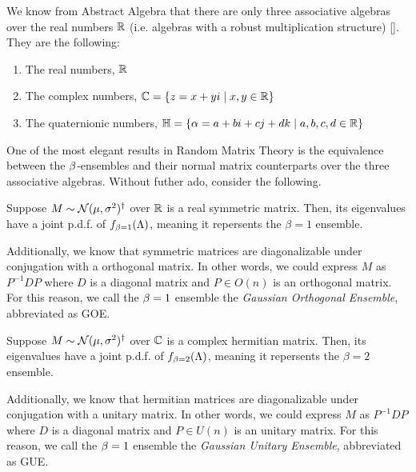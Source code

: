 We know from Abstract Algebra that there are only three associative algebras over the real numbers $\mathbb{R}$ (i.e. algebras with a robust multiplication structure) [\cite{dummit}].
They are the following:
\begin{enumerate}
  \item The real numbers, $\mathbb{R}$
  \item The complex numbers, $\mathbb{C} = \{ z = x + yi \mid x,y \in \mathbb{R} \}$
  \item The quaternionic numbers, $\mathbb{H} = \{ \alpha = a + bi + cj + dk \mid a,b,c,d \in \mathbb{R} \}$
\end{enumerate}


One of the most elegant results in Random Matrix Theory is the equivalence between the $\beta$-ensembles
and their normal matrix counterparts over the three associative algebras. Without futher ado, consider the following.

\medskip

 Suppose $M \sim \mathcal{N}(\mu,\sigma^2)^\dagger$ over $\mathbb{R}$ is a real symmetric matrix.
Then, its eigenvalues have a joint p.d.f. of $f_{\beta = 1}(\Lambda)$, meaning it repersents the $\beta = 1$ ensemble.

Additionally, we know that symmetric matrices are diagonalizable under conjugation with a orthogonal matrix.
In other words, we could express $M$ as $P^{-1} D P$ where $D$ is a diagonal matrix and $P \in O(n)$ is an orthogonal matrix.
For this reason, we call the $\beta = 1$ ensemble the \textit{Gaussian Orthogonal Ensemble}, abbreviated as GOE.

\bigskip

 Suppose $M \sim \mathcal{N}(\mu,\sigma^2)^\dagger$ over $\mathbb{C}$ is a complex hermitian matrix.
Then, its eigenvalues have a joint p.d.f. of $f_{\beta = 2}(\Lambda)$, meaning it repersents the $\beta = 2$ ensemble.

Additionally, we know that hermitian matrices are diagonalizable under conjugation with a unitary matrix.
In other words, we could express $M$ as $P^{-1} D P$ where $D$ is a diagonal matrix and $P \in U(n)$ is an unitary matrix.
For this reason, we call the $\beta = 1$ ensemble the \textit{Gaussian Unitary Ensemble}, abbreviated as GUE.

